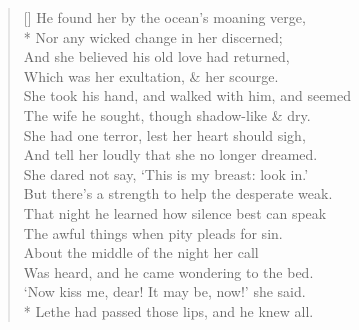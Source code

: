 \documentclass[MAIN]{subfiles}
\begin{document}
\settowidth{\versewidth}{She took his hand, and walked with him, and seemed}
\begin{verse}[\versewidth]
He found her by the ocean's moaning verge,\\*
\vin Nor any wicked change in her discerned;\\
\vin And she believed his old love had returned,\\
Which was her exultation, \& her scourge.\\
She took his hand, and walked with him, and seemed\\
\vin The wife he sought, though shadow-like \& dry.\\
\vin She had one terror, lest her heart should sigh,\\
And tell her loudly that she no longer dreamed.\\
She dared not say, `This is my breast: look in.'\\
\vin But there's a strength to help the desperate weak.\\
\vin That night he learned how silence best can speak\\
The awful things when pity pleads for sin.\\
About the middle of the night her call\\
\vin Was heard, and he came wondering to the bed.\\
\vin `Now kiss me, dear! It may be, now!' she said.\\*
{\sc Lethe} had passed those lips, and he knew all.
\end{verse}
\end{document}
